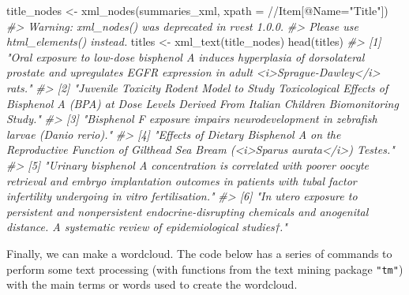\documentclass[
]{book}
\newenvironment{Shaded}{\begin{snugshade}}{\end{snugshade}}
\newcommand{\AttributeTok}[1]{\textcolor[rgb]{0.77,0.63,0.00}{#1}}
\newcommand{\CommentTok}[1]{\textcolor[rgb]{0.56,0.35,0.01}{\textit{#1}}}
\newcommand{\FunctionTok}[1]{\textcolor[rgb]{0.00,0.00,0.00}{#1}}
\newcommand{\NormalTok}[1]{#1}
\newcommand{\OtherTok}[1]{\textcolor[rgb]{0.56,0.35,0.01}{#1}}
\newcommand{\StringTok}[1]{\textcolor[rgb]{0.31,0.60,0.02}{#1}}
\begin{document}
\begin{Shaded}
\begin{Highlighting}[]
\NormalTok{title\_nodes }\OtherTok{\textless{}{-}} \FunctionTok{xml\_nodes}\NormalTok{(summaries\_xml, }\AttributeTok{xpath =} \StringTok{\textquotesingle{}//Item[@Name="Title"]\textquotesingle{}}\NormalTok{)}
\CommentTok{\#\textgreater{} Warning: \textasciigrave{}xml\_nodes()\textasciigrave{} was deprecated in rvest 1.0.0.}
\CommentTok{\#\textgreater{} Please use \textasciigrave{}html\_elements()\textasciigrave{} instead.}
\NormalTok{titles }\OtherTok{\textless{}{-}} \FunctionTok{xml\_text}\NormalTok{(title\_nodes)}
\FunctionTok{head}\NormalTok{(titles)}
\CommentTok{\#\textgreater{} [1] "Oral exposure to low{-}dose bisphenol A induces hyperplasia of dorsolateral prostate and upregulates EGFR expression in adult \textless{}i\textgreater{}Sprague{-}Dawley\textless{}/i\textgreater{} rats."                                   }
\CommentTok{\#\textgreater{} [2] "Juvenile Toxicity Rodent Model to Study Toxicological Effects of Bisphenol A (BPA) at Dose Levels Derived From Italian Children Biomonitoring Study."                                      }
\CommentTok{\#\textgreater{} [3] "Bisphenol F exposure impairs neurodevelopment in zebrafish larvae (Danio rerio)."                                                                                                          }
\CommentTok{\#\textgreater{} [4] "Effects of Dietary Bisphenol A on the Reproductive Function of Gilthead Sea Bream (\textless{}i\textgreater{}Sparus aurata\textless{}/i\textgreater{}) Testes."                                                                          }
\CommentTok{\#\textgreater{} [5] "Urinary bisphenol A concentration is correlated with poorer oocyte retrieval and embryo implantation outcomes in patients with tubal factor infertility undergoing in vitro fertilisation."}
\CommentTok{\#\textgreater{} [6] "In utero exposure to persistent and nonpersistent endocrine{-}disrupting chemicals and anogenital distance. A systematic review of epidemiological studies†."}
\end{Highlighting}
\end{Shaded}

Finally, we can make a wordcloud.
The code below has a series of commands to perform some text processing
(with functions from the text mining package \texttt{"tm"}) with the main terms
or words used to create the wordcloud.
\end{document}
